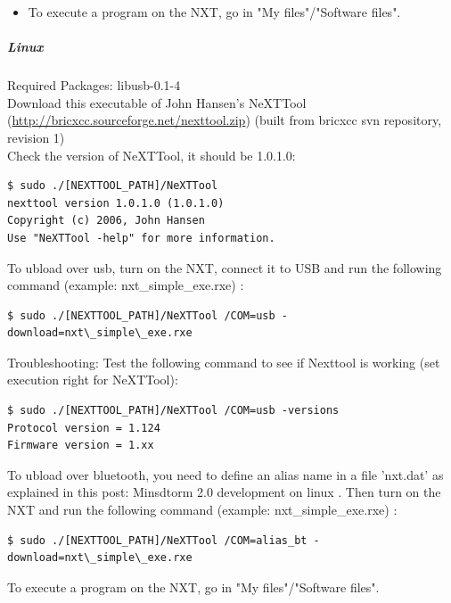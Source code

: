\begin{itemize}
\begin{center}[h]
	\end{center}
\item To execute a program on the NXT, go in "My files"/"Software files".
\end{itemize}

\subparagraph{Linux}
Required Packages: libusb-0.1-4\\
Download this executable of John Hansen's NeXTTool (\href{http://bricxcc.sourceforge.net/nexttool.zip}{http://bricxcc.sourceforge.net/nexttool.zip}) (built from bricxcc svn repository, revision 1)\\
Check the version of NeXTTool, it should be 1.0.1.0:
\begin{verbatim}
$ sudo ./[NEXTTOOL_PATH]/NeXTTool
nexttool version 1.0.1.0 (1.0.1.0)
Copyright (c) 2006, John Hansen
Use "NeXTTool -help" for more information.
\end{verbatim}

To ubload over usb, turn on the NXT, connect it to USB and run the following command (example: nxt\_simple\_exe.rxe) :
\begin{verbatim}
$ sudo ./[NEXTTOOL_PATH]/NeXTTool /COM=usb -download=nxt\_simple\_exe.rxe
\end{verbatim}

Troubleshooting: Test the following command to see if Nexttool is working (set execution right for NeXTTool):
\begin{verbatim}
$ sudo ./[NEXTTOOL_PATH]/NeXTTool /COM=usb -versions
Protocol version = 1.124
Firmware version = 1.xx
\end{verbatim}

To ubload over bluetooth, you need to define an alias name in a file 'nxt.dat' as explained in this post: Minsdtorm 2.0 development on linux . Then turn on the NXT and run the following command (example: nxt\_simple\_exe.rxe) :
\begin{verbatim}
$ sudo ./[NEXTTOOL_PATH]/NeXTTool /COM=alias_bt -download=nxt\_simple\_exe.rxe
\end{verbatim}

To execute a program on the NXT, go in "My files"/"Software files".

